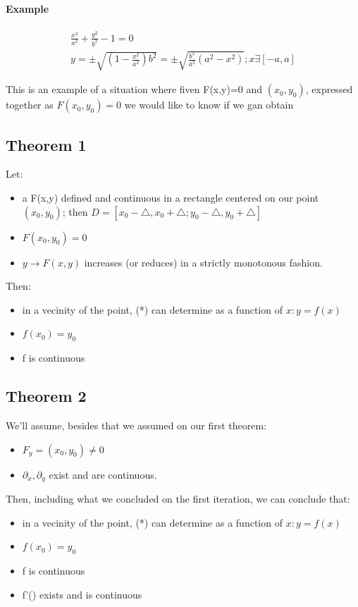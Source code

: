 \documentclass[11pt,fleqn]{book} %
\begin{document}
\paragraph*{Example}
\begin{gather}
    \frac{x^2}{a^2} + \frac{y^2}{b^2} - 1 = 0 \\
    y = \pm \sqrt{(1-\frac{x^2}{a^2})b^2} = \pm \sqrt{\frac{b^2}{a^2}(a^2 - x^2)}; x \exists [-a, a]
\end{gather}

This is an example of a situation where fiven F(x,y)=0 and $ (x_0, y_0) $, expressed together
as $F(x_0,y_0)=0$ we would like to know if we gan obtain

\subsection{Theorem 1}
Let:

\begin{itemize}
    \item a F(x,y) defined and continuous in a rectangle centered on our point $(x_0, y_0)$; then
    $ D = [x_0 - \triangle, x_0 + \triangle; y_0 - \triangle, y_0 + \triangle] $
    \item $F(x_0, y_0) = 0$
    \item $y \rightarrow F(x,y)$ increases (or reduces) in a strictly monotonous fashion.
\end{itemize}

Then:

\begin{itemize}
    \item in a vecinity of the point, (*) can determine as a function of $x: y = f(x)$
    \item $f(x_0) = y_0$
    \item f is continuous
\end{itemize}

\subsection{Theorem 2}

We'll assume, besides that we assumed on our first theorem:
\begin{itemize}
    \item $F_y = (x_0,y_0) \neq 0$
    \item $\partial_x, \partial_y$ exist and are continuous.
\end{itemize}

Then, including what we concluded on the first iteration, we can conclude that:
\begin{itemize}
    \item in a vecinity of the point, (*) can determine as a function of $x: y = f(x)$
    \item $f(x_0) = y_0$
    \item f is continuous
    \item f'() exists and is continuous
\end{itemize}
\end{document}
